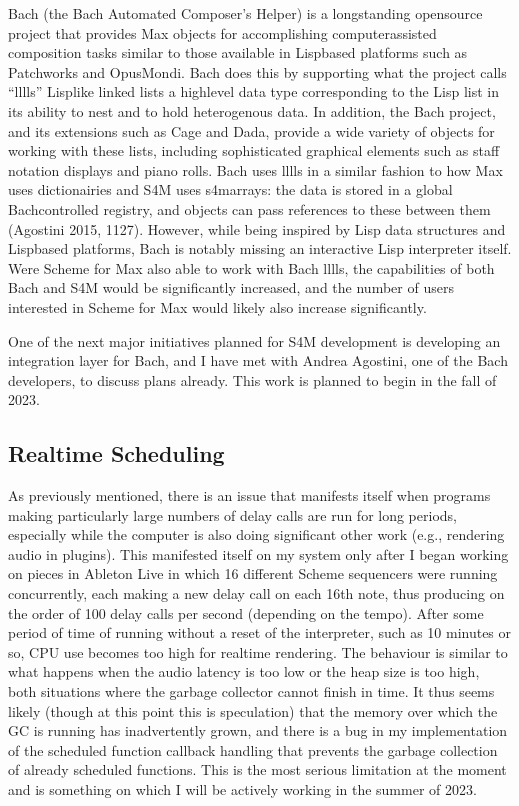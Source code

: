\documentclass[letterpaper,10pt,english]{sphinxmanual}
\begin{document}
\sphinxAtStartPar
Bach (the Bach Automated Composer’s Helper) is a long\sphinxhyphen{}standing open\sphinxhyphen{}source
project that provides Max objects for accomplishing computer\sphinxhyphen{}assisted composition
tasks similar to those available in Lisp\sphinxhyphen{}based platforms such as Patchworks and OpusMondi.
Bach does this by supporting what the project calls “lllls” \textendash{} Lisp\sphinxhyphen{}like linked lists \textendash{} a high\sphinxhyphen{}level
data type corresponding to the Lisp list in its ability to nest and to hold heterogenous data.
In addition, the Bach project, and its extensions such as Cage and Dada, provide
a wide variety of objects for working with these lists, including sophisticated graphical
elements such as staff notation displays and piano rolls.
Bach uses lllls in a similar fashion to how Max uses dictionairies
and S4M uses s4m\sphinxhyphen{}arrays: the data is stored in a global Bach\sphinxhyphen{}controlled registry,
and objects can pass references to these between them (Agostini 2015, 11\sphinxhyphen{}27).
However, while being inspired by Lisp data structures and Lisp\sphinxhyphen{}based platforms,
Bach is notably missing an interactive Lisp interpreter itself.
Were Scheme for Max also able to work with Bach lllls, the capabilities of both Bach
and S4M would be significantly increased, and the number of users interested in Scheme
for Max would likely also increase significantly.

\sphinxAtStartPar
One of the next major initiatives planned for S4M development is
developing an integration layer for Bach, and I have met with Andrea Agostini, one
of the Bach developers, to discuss plans already. This work is planned to begin
in the fall of 2023.


\subsection{Real\sphinxhyphen{}time Scheduling}
\label{\detokenize{conclusion:real-time-scheduling}}
\sphinxAtStartPar
As previously mentioned, there is an issue that manifests itself when programs
making particularly large numbers of delay calls are run for long periods, especially while
the computer is also doing significant other work (e.g., rendering audio in plugins).
This manifested itself on my system only after I began working on pieces in Ableton
Live in which 16 different Scheme sequencers were running concurrently, each
making a new delay call on each 16th note, thus producing on the order of 100 delay
calls per second (depending on the tempo).
After some period of time of running without a reset of the interpreter, such as 10 minutes or
so, CPU use becomes too high for realtime rendering.
The behaviour is similar to what happens when the audio latency is too low or
the heap size is too high, both situations where the garbage collector cannot finish in time.
It thus seems likely (though at this point this is speculation) that the memory
over which the GC is running has inadvertently grown, and there is a bug in my
implementation of the scheduled function callback handling that prevents the garbage
collection of already scheduled functions.
This is the most serious limitation at the moment and is something on which I will be actively
working in the summer of 2023.
\end{document}
